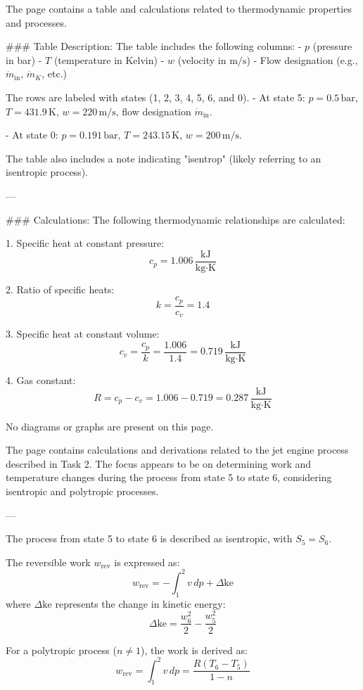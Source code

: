 The page contains a table and calculations related to thermodynamic properties and processes.  

### Table Description:  
The table includes the following columns:  
- \( p \) (pressure in bar)  
- \( T \) (temperature in Kelvin)  
- \( w \) (velocity in \( \text{m/s} \))  
- Flow designation (e.g., \( \dot{m}_{\text{in}} \), \( \dot{m}_K \), etc.)  

The rows are labeled with states (1, 2, 3, 4, 5, 6, and 0).  
- At state 5:  
  \( p = 0.5 \, \text{bar} \), \( T = 431.9 \, \text{K} \), \( w = 220 \, \text{m/s} \), flow designation \( \dot{m}_{\text{in}} \).  

- At state 0:  
  \( p = 0.191 \, \text{bar} \), \( T = 243.15 \, \text{K} \), \( w = 200 \, \text{m/s} \).  

The table also includes a note indicating "isentrop" (likely referring to an isentropic process).  

---

### Calculations:  
The following thermodynamic relationships are calculated:  

1. Specific heat at constant pressure:  
   \[
   c_p = 1.006 \, \frac{\text{kJ}}{\text{kg·K}}
   \]

2. Ratio of specific heats:  
   \[
   k = \frac{c_p}{c_v} = 1.4
   \]

3. Specific heat at constant volume:  
   \[
   c_v = \frac{c_p}{k} = \frac{1.006}{1.4} = 0.719 \, \frac{\text{kJ}}{\text{kg·K}}
   \]

4. Gas constant:  
   \[
   R = c_p - c_v = 1.006 - 0.719 = 0.287 \, \frac{\text{kJ}}{\text{kg·K}}
   \]  

No diagrams or graphs are present on this page.

The page contains calculations and derivations related to the jet engine process described in Task 2. The focus appears to be on determining work and temperature changes during the process from state 5 to state 6, considering isentropic and polytropic processes.

---

The process from state 5 to state 6 is described as isentropic, with \( S_5 = S_6 \).

The reversible work \( w_{\text{rev}} \) is expressed as:
\[
w_{\text{rev}} = -\int_1^2 v \, dp + \Delta \text{ke}
\]
where \( \Delta \text{ke} \) represents the change in kinetic energy:
\[
\Delta \text{ke} = \frac{w_6^2}{2} - \frac{w_5^2}{2}
\]

For a polytropic process (\( n \neq 1 \)), the work is derived as:
\[
w_{\text{rev}} = \int_1^2 v \, dp = \frac{R (T_6 - T_5)}{1 - n}
\]

